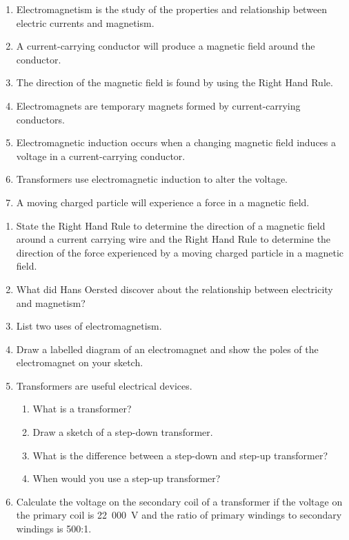 {{
\begin {enumerate}
\item Electromagnetism is the study of the properties and relationship between electric currents and magnetism.
\item A current-carrying conductor will produce a magnetic field around the conductor.
\item The direction of the magnetic field is found by using the Right Hand Rule.
\item Electromagnets are temporary magnets formed by current-carrying conductors.
\item Electromagnetic induction occurs when a changing magnetic field induces a voltage in a current-carrying conductor.
\item Transformers use electromagnetic induction to alter the voltage.
\item A moving charged particle will experience a force in a magnetic field.
\end {enumerate}

\begin{eocexercises}{}
\begin {enumerate}
\item State the Right Hand Rule to determine the direction of a magnetic field around a current carrying wire and the Right Hand Rule to determine the direction of the force experienced by a moving charged particle in a magnetic field.
\item What did Hans Oersted discover about the relationship between electricity and magnetism?
\item List two uses of electromagnetism.
\item Draw a labelled diagram of an electromagnet and show the poles of the electromagnet on your sketch.
\item Transformers are useful electrical devices.
\begin{enumerate}
\item What is a transformer?
\item Draw a sketch of a step-down transformer.
\item What is the difference between a step-down and step-up transformer?
\item When would you use a step-up transformer?

\end{enumerate}

\item Calculate the voltage on the secondary coil of a transformer if the voltage on the primary coil is 22~000~V and the ratio of primary windings to secondary windings is 500:1.


\end{enumerate}
\end{eocexercises}}}
